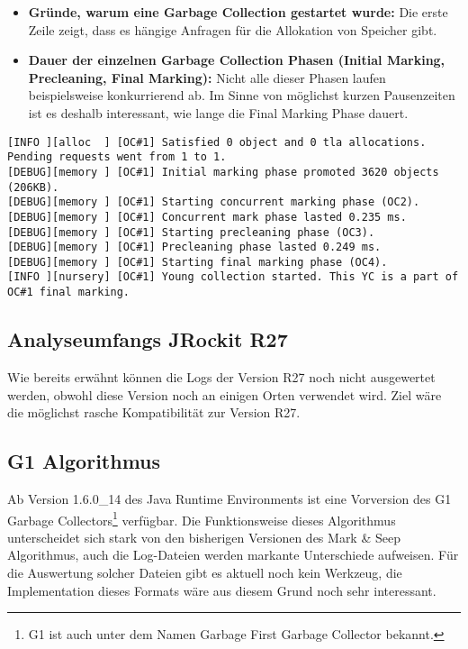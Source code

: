 \begin{itemize}
	\item \textbf{Gründe, warum eine Garbage Collection gestartet wurde:  }Die erste Zeile zeigt, dass es hängige Anfragen für die Allokation von Speicher gibt.
	\item \textbf{Dauer der einzelnen Garbage Collection Phasen (Initial Marking, Precleaning, Final Marking): } Nicht alle dieser Phasen laufen beispielsweise konkurrierend ab. Im Sinne von möglichst kurzen Pausenzeiten ist es deshalb interessant, wie lange die Final Marking Phase dauert. 
\end{itemize}

\begin{lstlisting}[caption=Garbage Collection Log (Debug Informationen)]
[INFO ][alloc  ] [OC#1] Satisfied 0 object and 0 tla allocations. Pending requests went from 1 to 1.
[DEBUG][memory ] [OC#1] Initial marking phase promoted 3620 objects (206KB).
[DEBUG][memory ] [OC#1] Starting concurrent marking phase (OC2).
[DEBUG][memory ] [OC#1] Concurrent mark phase lasted 0.235 ms.
[DEBUG][memory ] [OC#1] Starting precleaning phase (OC3).
[DEBUG][memory ] [OC#1] Precleaning phase lasted 0.249 ms.
[DEBUG][memory ] [OC#1] Starting final marking phase (OC4).
[INFO ][nursery] [OC#1] Young collection started. This YC is a part of OC#1 final marking.
\end{lstlisting}

\subsection{Analyseumfangs JRockit R27}\label{analyseumfang_jr27}
Wie bereits erwähnt können die Logs der Version R27 noch nicht ausgewertet werden, obwohl diese Version noch an einigen Orten verwendet wird. Ziel wäre die möglichst rasche Kompatibilität zur Version R27.

\subsection{G1 Algorithmus}
Ab Version 1.6.0\_14 des Java Runtime Environments ist eine Vorversion des G1 Garbage Collectors\footnote{G1 ist auch unter dem Namen Garbage First Garbage Collector bekannt.} verfügbar. Die Funktionsweise dieses Algorithmus unterscheidet sich stark von den bisherigen Versionen des Mark \& Seep Algorithmus, auch die Log-Dateien werden markante Unterschiede aufweisen. Für die Auswertung solcher Dateien gibt es aktuell noch kein Werkzeug, die Implementation dieses Formats wäre aus diesem Grund noch sehr interessant.








